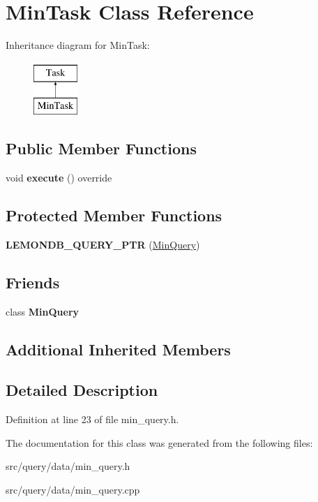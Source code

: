 \hypertarget{class_min_task}{}\section{Min\+Task Class Reference}
\label{class_min_task}
Inheritance diagram for Min\+Task\+:\begin{figure}[H]
\begin{center}
\leavevmode
\includegraphics[height=2.000000cm]{class_min_task}
\end{center}
\end{figure}
\subsection*{Public Member Functions}
\begin{DoxyCompactItemize}
\item 
\mbox{\label{class_min_task_a63daa4a5eb6eaa16b61ee882613c24cd}} 
void {\bfseries execute} () override
\end{DoxyCompactItemize}
\subsection*{Protected Member Functions}
\begin{DoxyCompactItemize}
\item 
\mbox{\label{class_min_task_a5d7caa2ed72e8af0eef14db1a81a96ef}} 
{\bfseries L\+E\+M\+O\+N\+D\+B\+\_\+\+Q\+U\+E\+R\+Y\+\_\+\+P\+TR} (\hyperlink{class_min_query}{Min\+Query})
\end{DoxyCompactItemize}
\subsection*{Friends}
\begin{DoxyCompactItemize}
\item 
\mbox{\label{class_min_task_a1cc07b58be7aab7a050da2e024b8ab04}} 
class {\bfseries Min\+Query}
\end{DoxyCompactItemize}
\subsection*{Additional Inherited Members}


\subsection{Detailed Description}


Definition at line 23 of file min\+\_\+query.\+h.



The documentation for this class was generated from the following files\+:\begin{DoxyCompactItemize}
\item 
src/query/data/min\+\_\+query.\+h\item 
src/query/data/min\+\_\+query.\+cpp\end{DoxyCompactItemize}
